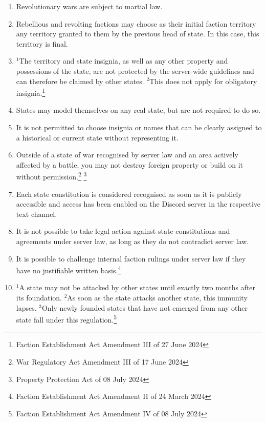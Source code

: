 \documentclass{article}
\begin{document}
\begin{enumerate}[(1)]
	\item Revolutionary wars are subject to martial law.
	\item Rebellious and revolting factions may choose as their initial faction territory any territory granted to them by the previous head of state. In this case, this territory is final.
    \item ${^1}$The territory and state insignia, as well as any other property and possessions of the state, are not protected by the server-wide guidelines and can therefore be claimed by other states. ${^2}$This does not apply for obligatory insignia.\footnote{Faction Establishment Act Amendment III of 27 June 2024}
    \item States may model themselves on any real state, but are not required to do so.
    \item It is not permitted to choose insignia or names that can be clearly assigned to a historical or current state without representing it.	
    \item Outside of a state of war recognised by server law and an area actively affected by a battle, you may not destroy foreign property or build on it without permission.\footnote{War Regulatory Act Amendment III of 17 June 2024} \footnote{Property Protection Act of 08 July 2024}
    \item Each state constitution is considered recognised as soon as it is publicly accessible and access has been enabled on the Discord server in the respective text channel.
    \item It is not possible to take legal action against state constitutions and agreements under server law, as long as they do not contradict server law.
    \item It is possible to challenge internal faction rulings under server law if they have no justifiable written basis.\footnote{Faction Establishment Act Amendment II of 24 March 2024}
	\item ${^1}$A state may not be attacked by other states until exactly two months after its foundation. ${^2}$As soon as the state attacks another state, this immunity lapses. ${^3}$Only newly founded states that have not emerged from any other state fall under this regulation.\footnote{Faction Establishment Act Amendment IV of 08 July 2024}
\end{enumerate}
\end{document}
